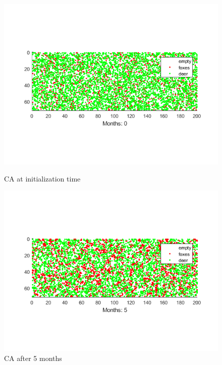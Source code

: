 \documentclass[a4paper,12pt]{article}
\begin{document}
\begin{figure}
        \centering
        \begin{minipage}[t]{0.48\textwidth}
                \includegraphics[width=\textwidth]{Task2starttime}
                \vspace{-20mm}
                \caption{CA at initialization time}
                \label{Task2start}
        \end{minipage}\hfill
        \begin{minipage}[t]{0.48\textwidth}
                \includegraphics[width=\textwidth]{Task2month5}
                \vspace{-20mm}
                \caption{CA after 5 months}
                \label{Task2M5}
        \end{minipage}
        \medskip


\end{figure}
\end{document}
